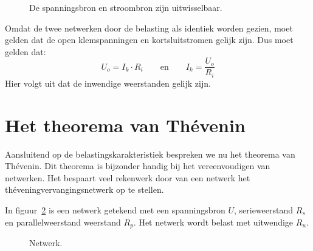 \begin{figure}[!ht]
\centering
{}
\caption{De spanningsbron en stroombron zijn uitwisselbaar.}
\label{fig:gelbelspanningstroom}
\end{figure}

Omdat de twee netwerken door de belasting als identiek worden gezien, moet gelden dat de open
klemspanningen en kortsluitstromen gelijk zijn. Dus moet gelden dat:
%
\begin{equation}
U_o = I_k\cdot R_i \qquad \text{en} \qquad I_k = \dfrac{U_o}{R_i}
\end{equation}
%
Hier volgt uit dat de inwendige weerstanden gelijk zijn.

\section{Het theorema van Th\'evenin}
Aansluitend op de belastingskarakteristiek bespreken we nu het theorema van Th\'evenin.
Dit theorema is bijzonder handig bij het vereenvoudigen van netwerken. Het bespaart veel
rekenwerk door van een netwerk het th\'eveningvervangingsnetwerk op te stellen.

In figuur~\ref{fig:geltheveninbeginschema} is een netwerk getekend met een spanningsbron $U$,
serieweerstand $R_s$ en parallelweerstand weerstand $R_p$. Het netwerk wordt belast met uitwendige $R_u$.

\begin{figure}[!ht]
\centering
{}
\caption{Netwerk.}
\label{fig:geltheveninbeginschema}
\end{figure}

